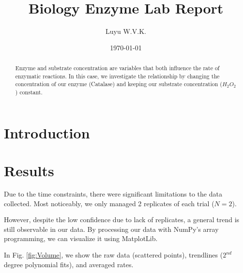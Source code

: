 \documentclass[prl,twocolumn,amsmath,amssymb,superscriptaddress]{revtex4-2}
\begin{document}
\title{Biology Enzyme Lab Report}
\author{Luyu W.V.K.}
\date{\today}

\begin{abstract}
    Enzyme and substrate concentration are variables that both influence the rate of enzymatic reactions. In this case, we investigate the relationship by changing the concentration of our enzyme (Catalase) and keeping our substrate concentration ($H_{2}O_2$) constant.
\end{abstract}
\maketitle

\section{Introduction}
\section{Results}

Due to the time constraints, there were significant limitations to the data collected. Most noticeably, we only managed 2 replicates of each trial ($N=2$).

However, despite the low confidence due to lack of replicates, a general trend is still observable in our data. By processing our data with NumPy's array programming, we can visualize it using MatplotLib.

In Fig. \ref{fig:Volume}, we show the raw data (scattered points), trendlines ($2^{nd}$ degree polynomial fits), and averaged rates.
\end{document}
